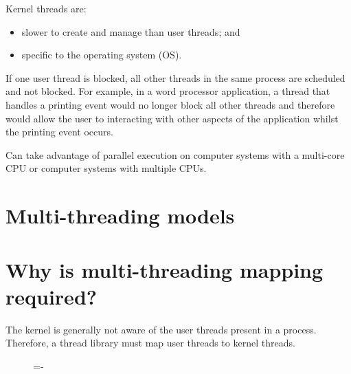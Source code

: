\documentclass[a4paper]{systems-software}
\begin{document}
Kernel threads are:
\begin{itemize}
	\item slower to create and manage than user threads; and
	\item specific to the operating system (OS).
\end{itemize}

If one user thread is blocked, all other threads in the same process are scheduled and not blocked. For example, in a word processor application, a thread that handles a printing event would no longer block all other threads and therefore would allow the user to interacting with other aspects of the application whilst the printing event occurs.

Can take advantage of parallel execution on computer systems with a multi-core CPU or computer systems with multiple CPUs.



\section{Multi-threading models}

\section*{Why is multi-threading mapping required?}

The kernel is generally not aware of the user threads present in a process. Therefore, a thread library must map user threads to kernel threads.


\begin{figure}[H]
  \lineskip=-\fboxrule
\end{figure}
\end{document}
